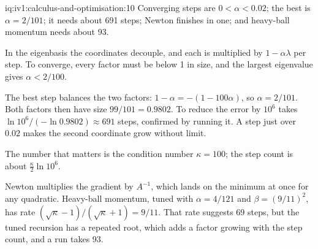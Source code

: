 \begin{solution}{iq:iv1:calculus-and-optimisation:10}
Converging steps are $0 < \alpha < 0.02$; the best is $\alpha = 2/101$; it needs about 691 steps; Newton finishes in one; and heavy-ball momentum needs about 93.

In the eigenbasis the coordinates decouple, and each is multiplied by $1 - \alpha\lambda$ per step. To converge, every factor must be below 1 in size, and the largest eigenvalue gives $\alpha < 2/100$.

The best step balances the two factors: $1 - \alpha = -(1 - 100\alpha)$, so $\alpha = 2/101$. Both factors then have size $99/101 = 0.9802$. To reduce the error by $10^6$ takes $\ln 10^6 / (-\ln 0.9802) \approx 691$ steps, confirmed by running it. A step just over $0.02$ makes the second coordinate grow without limit.

The number that matters is the condition number $\kappa = 100$; the step count is about $\frac{\kappa}{2}\ln 10^6$.

Newton multiplies the gradient by $A^{-1}$, which lands on the minimum at once for any quadratic. Heavy-ball momentum, tuned with $\alpha = 4/121$ and $\beta = (9/11)^2$, has rate $(\sqrt{\kappa} - 1)/(\sqrt{\kappa} + 1) = 9/11$. That rate suggests 69 steps, but the tuned recursion has a repeated root, which adds a factor growing with the step count, and a run takes 93.



\end{solution}


